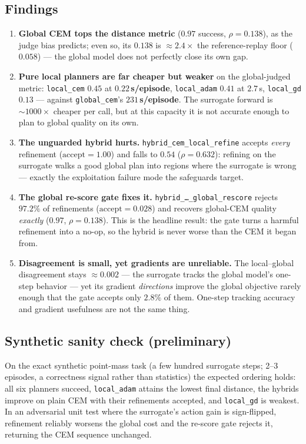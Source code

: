 \documentclass[11pt,a4paper]{article}
\begin{document}
\subsection{Findings}
\begin{enumerate}[leftmargin=1.5em]
\item \textbf{Global CEM tops the distance metric} ($0.97$ success,
$\rho=0.138$), as the judge bias predicts; even so, its $0.138$ is
${\approx}2.4\times$ the reference-replay floor ($0.058$) --- the global model
does not perfectly close its own gap.
\item \textbf{Pure local planners are far cheaper but weaker} on the
global-judged metric: \texttt{local\_cem} $0.45$ at \textbf{$0.22$\,s/episode},
\texttt{local\_adam} $0.41$ at $2.7$\,s, \texttt{local\_gd} $0.13$ --- against
\texttt{global\_cem}'s \textbf{$231$\,s/episode}. The surrogate forward is
${\sim}1000\times$ cheaper per call, but at this capacity it is not accurate
enough to plan to global quality on its own.
\item \textbf{The unguarded hybrid hurts.}
\texttt{hybrid\_cem\_local\_refine} accepts \emph{every} refinement
($\text{accept}{=}1.00$) and falls to $0.54$ ($\rho=0.632$): refining on the
surrogate walks a good global plan into regions where the surrogate is wrong
--- exactly the exploitation failure mode the safeguards target.
\item \textbf{The global re-score gate fixes it.}
\texttt{hybrid\_\dots\_global\_rescore} rejects $97.2\%$ of refinements
($\text{accept}{=}0.028$) and recovers global-CEM quality \emph{exactly}
($0.97$, $\rho=0.138$). This is the headline result: the gate turns a harmful
refinement into a no-op, so the hybrid is never worse than the CEM it began
from.
\item \textbf{Disagreement is small, yet gradients are unreliable.} The
local--global disagreement stays ${\approx}0.002$ --- the surrogate tracks the
global model's one-step behavior --- yet its gradient \emph{directions} improve
the global objective rarely enough that the gate accepts only $2.8\%$ of them.
One-step tracking accuracy and gradient usefulness are not the same thing.
\end{enumerate}

\subsection{Synthetic sanity check (preliminary)}
On the exact synthetic point-mass task (a few hundred surrogate steps; 2--3
episodes, a correctness signal rather than statistics) the expected ordering
holds: all six planners succeed, \texttt{local\_adam} attains the lowest final
distance, the hybrids improve on plain CEM with their refinements accepted, and
\texttt{local\_gd} is weakest. In an adversarial unit test where the surrogate's
action gain is sign-flipped, refinement reliably worsens the global cost and the
re-score gate rejects it, returning the CEM sequence unchanged.
\end{document}
